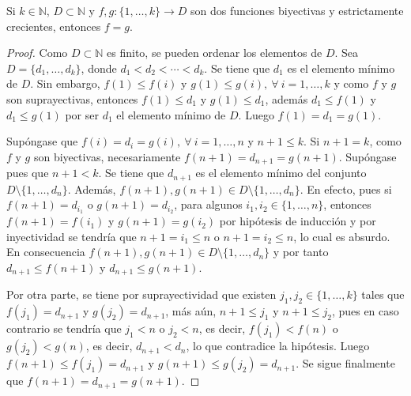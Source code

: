 \begin{lemma}
Si $k\in\mathbb{N}$, $D\subset \mathbb{N}$ y $f,g: \{1,\ldots,k\} \longrightarrow D$ son dos funciones biyectivas y estrictamente crecientes, entonces $f=g$.
\end{lemma}
\begin{proof}
Como $D\subset \mathbb{N}$ es finito, se pueden ordenar los elementos de $D$. Sea $D=\{d_1,\ldots,d_k\}$, donde $d_1<d_2<\cdots<d_k$. Se tiene que $d_1$ es el elemento mínimo de $D$. Sin embargo, $f(1)\leq f(i)$ y $g(1)\leq g(i),\:\forall \: i=1,\ldots,k$ y como $f$ y $g$ son suprayectivas, entonces $f(1)\leq d_1$ y $g(1)\leq d_1$, además $d_1\leq f(1)$ y $d_1\leq g(1)$ por ser $d_1$ el elemento mínimo de $D$. Luego $f(1)=d_1=g(1)$.
\bigskip


Supóngase que $f(i)=d_i=g(i),\:\forall \: i=1,\ldots,n$ y $n+1\leq k$. Si $n+1=k$, como $f$ y $g$ son biyectivas, necesariamente $f(n+1)=d_{n+1}=g(n+1)$. Supóngase pues que $n+1<k$. Se tiene que $d_{n+1}$ es el elemento mínimo del conjunto $D \setminus \{1,\ldots,d_n\}$. Además, $f(n+1),g(n+1)\in D\setminus \{1,\ldots,d_n\}$. En efecto, pues si $f(n+1)=d_{i_1}$ o $g(n+1)=d_{i_2}$, para algunos $i_1,i_2\in \{1,\ldots,n\}$, entonces $f(n+1)=f(i_1)$ y $g(n+1)=g(i_2)$ por hipótesis de inducción y por inyectividad se tendría que $n+1=i_1\leq n$ o $n+1=i_2\leq n$, lo cual es absurdo. En consecuencia $f(n+1),g(n+1)\in D \setminus \{1,\ldots,d_n\}$ y por tanto $d_{n+1}\leq f(n+1)$ y $d_{n+1}\leq g(n+1)$. 
\bigskip

Por otra parte, se tiene por suprayectividad que existen $j_1,j_2\in \{1,\ldots,k\}$ tales que $f(j_1)=d_{n+1}$ y $g(j_2)=d_{n+1}$, más aún, $n+1\leq j_1$ y $n+1\leq j_2$, pues en caso contrario se tendría que $j_1<n$ o $j_2<n$, es decir, $f(j_1)<f(n)$ o $g(j_2)<g(n)$, es decir, $d_{n+1}<d_n$, lo que contradice la hipótesis. Luego $f(n+1)\leq f(j_1)=d_{n+1}$ y $g(n+1)\leq g(j_2)=d_{n+1}$. Se sigue finalmente que $f(n+1)=d_{n+1}=g(n+1)$.
\end{proof}

